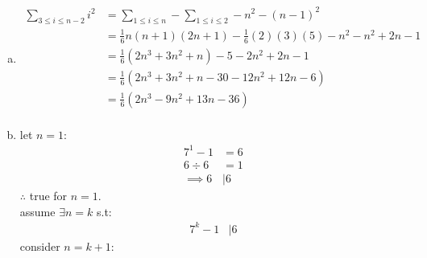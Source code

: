 \documentclass{article}
\begin{document}
\begin{enumerate}
\begin{enumerate}[(a)]
\begin{align*}
                                      &=\frac{1}{6}(k^{2}+k)(2k+1)+k^{2}+2k+1\\
                                      &=\frac{1}{6}(2k^{2}+2k^{2}+k^{2}+k)+k^{2}+2k+1\\
                                      &=\frac{1}{6}(2k^{3}+3k^{2}+k+6k^{2}+12k+6)\\
                                      &=\frac{1}{6}(2k^{3}+9k^{2}+13k+6)\\
                                      &=\frac{1}{6}(k+1)(2k^{2}+7k+6)\\
                                      &=\frac{1}{6}(k+1)(k+2)(2k+3)\\
                                      &=\frac{1}{6}(k+1)((k+1)+1)(2(k+1)+1)
          \end{align*}
          $\implies$ true for $n=k+1$.\\
          $\therefore$ as true for $n=1$ and true for $n=k\implies$ true for $n=k+1\implies\ \sum_{1\le i \le n}i^{2}=\frac{1}{6}n(n+1)(2n+1)\ \forall n\in \mathbb{Z}^{+}.$
    \item
          \begin{align*}
            \sum_{3\le i \le n-2}i^{2}&=\sum_{1\le i \le n}-\sum_{1\le i \le 2}-n^{2}-(n-1)^{2}\\
                                      &=\frac{1}{6}n(n+1)(2n+1)-\frac{1}{6}(2)(3)(5)-n^{2}-n^{2}+2n-1\\
                                      &=\frac{1}{6}(2n^{3}+3n^{2}+n)-5-2n^{2}+2n-1\\
                                      &=\frac{1}{6}(2n^{3}+3n^{2}+n-30-12n^{2}+12n-6)\\
                                      &=\frac{1}{6}(2n^{3}-9n^{2}+13n-36)\\
            \end{align*}
    \item
          let $n=1$:
          \begin{align*}
            7^{1}-1&=6\\
            6\div 6&=1\\
            \implies6&\mid6
          \end{align*}
          $\therefore$ true for $n=1$.\\
          assume $\exists n=k$ s.t:
          \begin{align*}
            7^{k}-1&\mid 6
          \end{align*}
          consider $n=k+1$:
          \begin{align*}

\end{align*}
\end{enumerate}
\end{enumerate}
\end{document}
